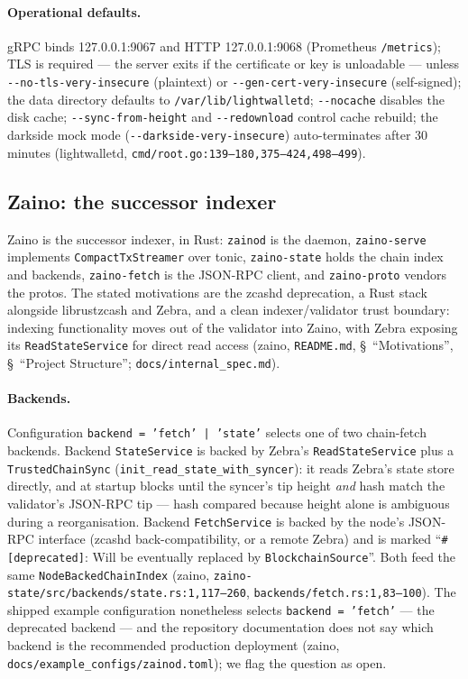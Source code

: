 \documentclass[11pt,a4paper]{article}
\theoremstyle{definition}
\begin{document}
\paragraph{Operational defaults.} gRPC binds 127.0.0.1:9067 and HTTP
127.0.0.1:9068 (Prometheus \texttt{/metrics}); TLS is required --- the
server exits if the certificate or key is unloadable --- unless
\texttt{-{}-no-tls-very-insecure} (plaintext) or
\texttt{-{}-gen-cert-very-insecure} (self-signed); the data directory
defaults to \texttt{/var/lib/lightwalletd}; \texttt{-{}-nocache} disables
the disk cache; \texttt{-{}-sync-from-height} and
\texttt{-{}-redownload} control cache rebuild; the darkside mock mode
(\texttt{-{}-darkside-very-insecure}) auto-terminates after 30 minutes
(\textsf{lightwalletd}, \texttt{cmd/root.go:139--180,375--424,498--499}).

\subsection{Zaino: the successor indexer}\label{sec:sync-zaino}

Zaino is the successor indexer, in Rust: \texttt{zainod} is the daemon,
\texttt{zaino-serve} implements \texttt{CompactTxStreamer} over tonic,
\texttt{zaino-state} holds the chain index and backends,
\texttt{zaino-fetch} is the JSON-RPC client, and \texttt{zaino-proto}
vendors the protos. The stated motivations are the zcashd deprecation, a
Rust stack alongside librustzcash and Zebra, and a clean
indexer/validator trust boundary: indexing functionality moves out of
the validator into Zaino, with Zebra exposing its
\texttt{ReadStateService} for direct read access (\textsf{zaino},
\texttt{README.md}, \S~``Motivations'', \S~``Project Structure'';
\texttt{docs/internal\_spec.md}).

\paragraph{Backends.} Configuration \texttt{backend = 'fetch' | 'state'}
selects one of two chain-fetch backends. Backend \texttt{StateService} is
backed
by Zebra's \texttt{ReadStateService} plus a \texttt{TrustedChainSync}
(\texttt{init\_read\_state\_with\_syncer}): it reads Zebra's state store
directly, and at startup blocks until the syncer's tip height \emph{and}
hash match the validator's JSON-RPC tip --- hash compared because height
alone is ambiguous during a reorganisation. Backend \texttt{FetchService}
is backed by the node's JSON-RPC interface (zcashd back-compatibility, or a
remote Zebra) and is marked ``\texttt{\#[deprecated]}: Will be eventually
replaced by \texttt{BlockchainSource}''. Both feed the same
\texttt{NodeBackedChainIndex} (\textsf{zaino},
\texttt{zaino-state/src/backends/state.rs:1,117--260},
\texttt{backends/fetch.rs:1,83--100}). The shipped example configuration
nonetheless selects \texttt{backend = 'fetch'} --- the deprecated backend
--- and the repository documentation does not say which backend is the
recommended production deployment
(\textsf{zaino}, \texttt{docs/example\_configs/zainod.toml}); we flag
the question as open.
\end{document}
